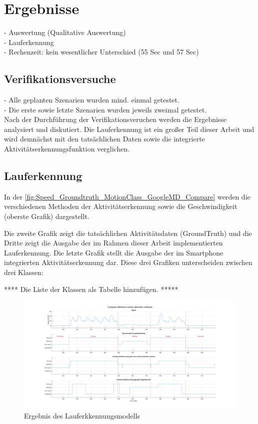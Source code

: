 \chapter{Ergebnisse}


- Auswertung (Qualitative Auswertung)\\
- Lauferkennung \\
- Rechenzeit: kein wesentlicher Unterschied (55 Sec und 57 Sec)

\section{Verifikationsversuche}

- Alle geplanten Szenarien wurden mind. einmal getestet.\\

- Die erste sowie letzte Szenarien wurden jeweils zweimal getestet.\\

Nach der Durchführung der Verifikationsveruchen werden die Ergebnisse analysiert und diskutiert. Die Lauferkennung ist ein großer Teil dieser Arbeit und wird demnächst mit den tatsächlichen Daten sowie die integrierte Aktivitätserkennungsfunktion verglichen.
\section{Lauferkennung}
In der \autoref{fig:Speed_Groundtruth_MotionClass_GoogleMD_Compare} werden die verschiedenen Methoden der Aktivitätserkennung sowie die Geschwindigkeit (oberste Grafik) dargestellt.

Die zweite Grafik zeigt die tatsächlichen Aktivitätsdaten (GroundTruth) und die Dritte zeigt die Ausgabe der im Rahmen dieser Arbeit implementierten Lauferkennung.
Die letzte Grafik stellt die Ausgabe der im Smartphone integrierten Aktivitätserkennung dar. Diese drei Grafiken unterscheiden zwischen drei Klassen:

**** Die Liste der Klassen als Tabelle hinzufügen. *****

\begin{figure}[H]
	\centering
	\includegraphics[width=\linewidth]{Bilder/Speed_Groundtruth_MotionClass_GoogleMD_Compare.png}
	\caption{Ergebnis des Lauferkkennungsmodells}
	\label{fig:Speed_Groundtruth_MotionClass_GoogleMD_Compare}
\end{figure}


